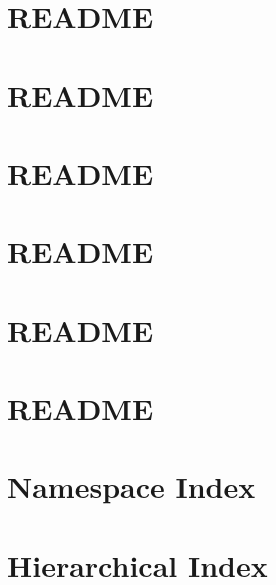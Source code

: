 \documentclass[twoside]{book}
\newcommand{\+}{\discretionary{\mbox{\scriptsize$\hookleftarrow$}}{}{}}
\begin{document}
\chapter{README}
\label{md_smacc2_sm_reference_library_sm_multi_ur5_sim_README}

\chapter{README}
\label{md_smacc2_sm_reference_library_sm_pack_ml_README}

\chapter{README}
\label{md_smacc2_sm_reference_library_sm_pubsub_1_README}

\chapter{README}
\label{md_smacc2_sm_reference_library_sm_respira_1_README}

\chapter{README}
\label{md_smacc2_sm_reference_library_sm_test_moveit_ur5_sim_README}

\chapter{README}
\label{md_smacc2_sm_reference_library_sm_three_some_README}

\chapter{Namespace Index}

\chapter{Hierarchical Index}

\end{document}
